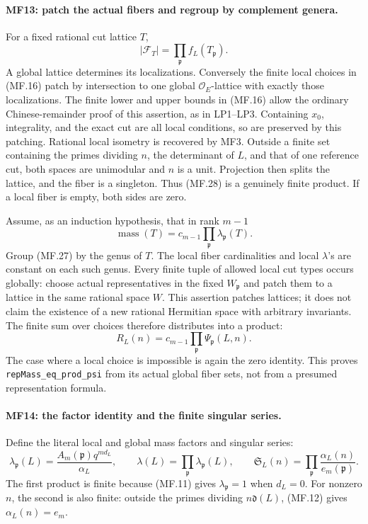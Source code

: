 \paragraph{MF13: patch the actual fibers and regroup by complement genera.}
For a fixed rational cut lattice \(T\),
\[
                    |\mathcal F_T|
                          =\prod_{\mathfrak p}f_L(T_{\mathfrak p}).
                                                               \tag{MF.28}
\]
A global lattice determines its localizations. Conversely the finite
local choices in (MF.16) patch by intersection to one global
\(\mathcal O_E\)-lattice with exactly those localizations.
The finite lower and upper bounds in (MF.16) allow the ordinary
Chinese-remainder proof of this assertion, as in LP1--LP3.
Containing \(x_0\), integrality, and the exact cut are all local
conditions, so are preserved by this patching. Rational local
isometry is recovered by MF3.
Outside a finite set containing the primes dividing \(n\), the
determinant of \(L\), and that of one reference cut, both spaces
are unimodular and \(n\) is a unit. Projection then splits the
lattice, and the fiber is a singleton. Thus (MF.28) is a genuinely
finite product. If a local fiber is empty, both sides are zero.

Assume, as an induction hypothesis, that in rank \(m-1\)
\[
                  \operatorname{mass}(T)
                    =c_{m-1}\prod_{\mathfrak p}\lambda_{\mathfrak p}(T).
                                                               \tag{MF.29}
\]
Group (MF.27) by the genus of \(T\). The local fiber cardinalities
and local \(\lambda\)'s are constant on each such genus.
Every finite tuple of allowed local cut types occurs globally:
choose actual representatives in the fixed \(W_{\mathfrak p}\)
and patch them to a lattice in the same rational space \(W\).
This assertion patches lattices; it does not claim the existence
of a new rational Hermitian space with arbitrary invariants.
The finite sum over choices therefore distributes into a product:
\[
                       R_L(n)
                   =c_{m-1}\prod_{\mathfrak p}\Psi_{\mathfrak p}(L,n).
                                                               \tag{MF.30}
\]
The case where a local choice is impossible is again the zero
identity. This proves \texttt{repMass\_eq\_prod\_psi} from its actual
global fiber sets, not from a presumed representation formula.

\paragraph{MF14: the factor identity and the finite singular series.}
Define the literal local and global mass factors and singular series:
\[
 \lambda_{\mathfrak p}(L)=
       \frac{A_m(\mathfrak p)q^{m d_L}}{\alpha_L},\qquad
 \lambda(L)=\prod_{\mathfrak p}\lambda_{\mathfrak p}(L),\qquad
 \mathfrak S_L(n)=\prod_{\mathfrak p}
                        \frac{\alpha_L(n)}{e_m(\mathfrak p)}.
                                                               \tag{MF.31}
\]
The first product is finite because (MF.11) gives
\(\lambda_{\mathfrak p}=1\) when \(d_L=0\).
For nonzero \(n\), the second is also finite: outside the primes
dividing \(n\mathfrak d(L)\), (MF.12) gives \(\alpha_L(n)=e_m\).

